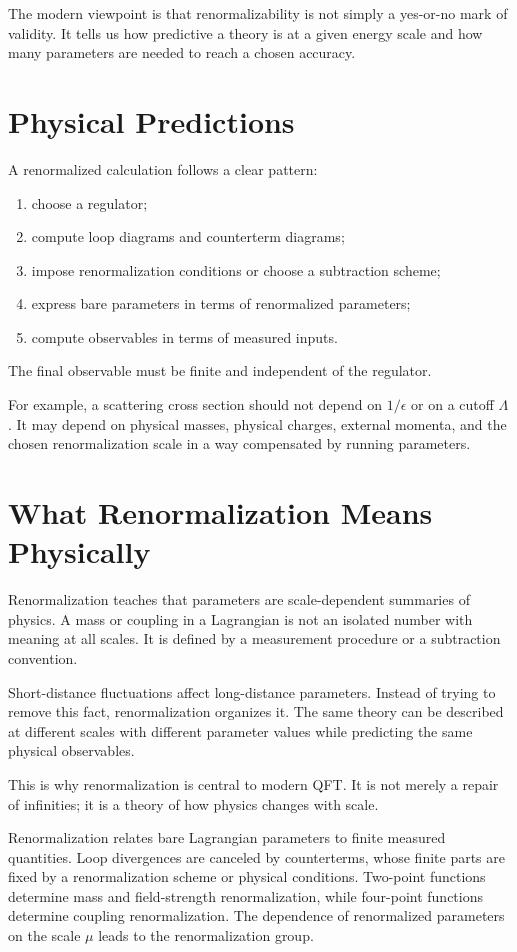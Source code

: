 The modern viewpoint is that renormalizability is not simply a yes-or-no mark of
validity. It tells us how predictive a theory is at a given energy scale and how
many parameters are needed to reach a chosen accuracy.

\section{Physical Predictions}

A renormalized calculation follows a clear pattern:
\begin{enumerate}
    \item choose a regulator;
    \item compute loop diagrams and counterterm diagrams;
    \item impose renormalization conditions or choose a subtraction scheme;
    \item express bare parameters in terms of renormalized parameters;
    \item compute observables in terms of measured inputs.
\end{enumerate}
The final observable must be finite and independent of the regulator.

For example, a scattering cross section should not depend on \(1/\epsilon\) or on
a cutoff \(\Lambda\). It may depend on physical masses, physical charges,
external momenta, and the chosen renormalization scale in a way compensated by
running parameters.

\section{What Renormalization Means Physically}

Renormalization teaches that parameters are scale-dependent summaries of physics.
A mass or coupling in a Lagrangian is not an isolated number with meaning at all
scales. It is defined by a measurement procedure or a subtraction convention.

Short-distance fluctuations affect long-distance parameters. Instead of trying
to remove this fact, renormalization organizes it. The same theory can be
described at different scales with different parameter values while predicting
the same physical observables.

This is why renormalization is central to modern QFT. It is not merely a repair
of infinities; it is a theory of how physics changes with scale.

\begin{summarybox}
Renormalization relates bare Lagrangian parameters to finite measured quantities.
Loop divergences are canceled by counterterms, whose finite parts are fixed by a
renormalization scheme or physical conditions. Two-point functions determine mass
and field-strength renormalization, while four-point functions determine coupling
renormalization. The dependence of renormalized parameters on the scale \(\mu\)
leads to the renormalization group.
\end{summarybox}

